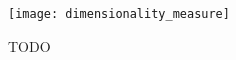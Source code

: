 \begin{figure}
\begin{center}

\texttt{[image: dimensionality\_measure]}
\caption{
TODO
}
\label{fig:dimensionality_measure}

\end{center}
\end{figure}
